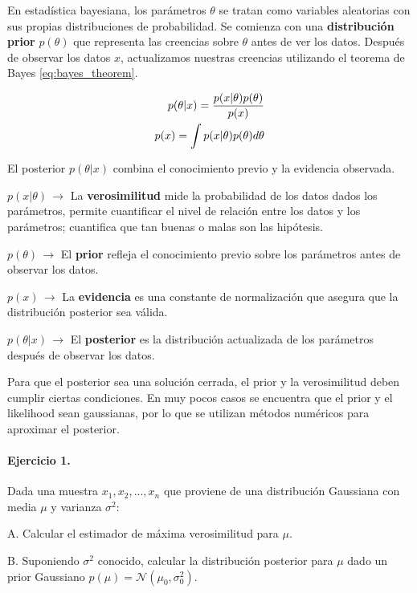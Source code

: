 En estadística bayesiana, los parámetros \(\theta\) se tratan como variables aleatorias con sus propias distribuciones de probabilidad. Se comienza con una \textbf{distribución prior} \(p(\theta)\) que representa las creencias sobre \(\theta\) antes de ver los datos. Después de observar los datos \(x\), actualizamos nuestras creencias utilizando el teorema de Bayes \eqref{eq:bayes_theorem}.

\begin{align}
    p(\theta|x) = \frac{p(x|\theta) p(\theta)}{p(x)} \label{eq:bayes_theorem} \\
    p(x) = \int p(x|\theta) p(\theta) d\theta \notag
\end{align}

El posterior \(p(\theta|x)\) combina el conocimiento previo y la evidencia observada.

\(p(x|\theta)\,\rightarrow\) La \textbf{verosimilitud} mide la probabilidad de los datos dados los parámetros, permite cuantificar el nivel de relación entre los datos y los parámetros; cuantifica que tan buenas o malas son las hipótesis.

\(p(\theta)\,\rightarrow\) El \textbf{prior} refleja el conocimiento previo sobre los parámetros antes de observar los datos.

\(p(x)\,\rightarrow\) La \textbf{evidencia} es una constante de normalización que asegura que la distribución posterior sea válida.

\(p(\theta|x)\,\rightarrow\)  El \textbf{posterior} es la distribución actualizada de los parámetros después de observar los datos.

Para que el posterior sea una solución cerrada, el prior y la verosimilitud deben cumplir ciertas condiciones. En muy pocos casos se encuentra que el prior y el likelihood sean gaussianas, por lo que se utilizan métodos numéricos para aproximar el posterior. 

\paragraph{Ejercicio 1.} Dada una muestra \(x_1, x_2, ..., x_n\) que proviene de una distribución Gaussiana con media \(\mu\) y varianza \(\sigma^2\): 

A. Calcular el estimador de máxima verosimilitud para \(\mu\).

B. Suponiendo \(\sigma^2\) conocido, calcular la distribución posterior para \(\mu\) dado un prior Gaussiano \(p(\mu) = \mathcal{N}(\mu_0, \sigma_0^2)\).

